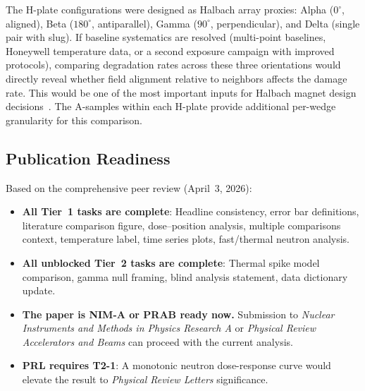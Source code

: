 \documentclass[11pt,letterpaper]{article}
\begin{document}
\begin{description}[style=nextline]
    \item[T3-5: Resolve H-Plate Configuration Differences for Halbach Design]
    The H-plate configurations were designed as Halbach array proxies:
    Alpha ($0^\circ$, aligned), Beta ($180^\circ$, antiparallel), Gamma
    ($90^\circ$, perpendicular), and Delta (single pair with slug). If
    baseline systematics are resolved (multi-point baselines, Honeywell
    temperature data, or a second exposure campaign with improved protocols),
    comparing degradation rates across these three orientations would directly
    reveal whether field alignment relative to neighbors affects the damage
    rate. This would be one of the most important inputs for Halbach magnet
    design decisions~\cite{NGotta2024}. The A-samples within each H-plate
    provide additional per-wedge granularity for this comparison.
\end{description}

\subsection{Publication Readiness}

Based on the comprehensive peer review (April~3, 2026):

\begin{itemize}
    \item \textbf{All Tier~1 tasks are complete}: Headline consistency, error
    bar definitions, literature comparison figure, dose--position analysis,
    multiple comparisons context, temperature label, time series plots,
    fast/thermal neutron analysis.

    \item \textbf{All unblocked Tier~2 tasks are complete}: Thermal spike
    model comparison, gamma null framing, blind analysis statement, data
    dictionary update.

    \item \textbf{The paper is NIM-A or PRAB ready now.} Submission to
    \textit{Nuclear Instruments and Methods in Physics Research A} or
    \textit{Physical Review Accelerators and Beams} can proceed with the
    current analysis.

    \item \textbf{PRL requires T2-1}: A monotonic neutron dose-response curve
    would elevate the result to \textit{Physical Review Letters} significance.
\end{itemize}

\end{document}

